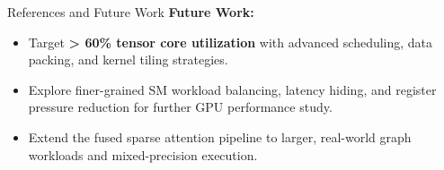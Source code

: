 \documentclass[final]{beamer}
\newlength{\sepwidth}
\newlength{\colwidth}
\newcommand{\separatorcolumn}{\begin{column}{\sepwidth}\end{column}}
\begin{document}
\begin{frame}[t]
\begin{columns}[t]
\begin{column}{\colwidth}
\begin{block}{References and Future Work}
    \textbf{Future Work:}
    \begin{itemize}
      \item Target \textbf{> 60\% tensor core utilization} with advanced scheduling, data packing, and kernel tiling strategies.
      \item Explore finer-grained SM workload balancing, latency hiding, and register pressure reduction for further GPU performance study.
      \item Extend the fused sparse attention pipeline to larger, real-world graph workloads and mixed-precision execution.
    \end{itemize}

  \end{block}

\end{column}

\separatorcolumn

\end{columns}

\end{frame}
\end{document}
